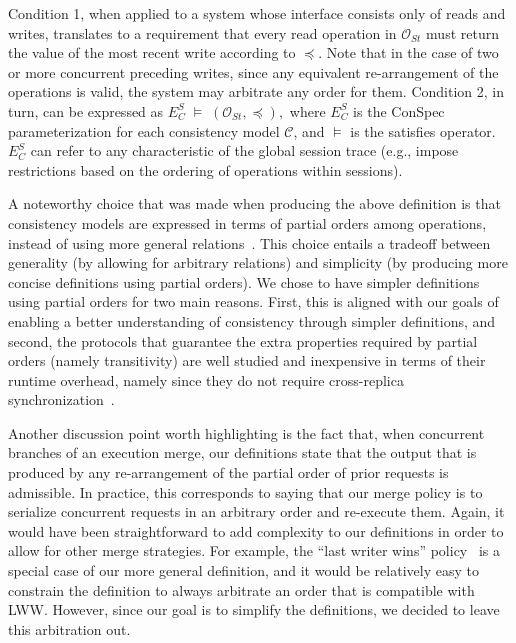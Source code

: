 \documentclass[journal, compsoc]{IEEEtran}
\begin{document}
	Condition 1, when applied to a system whose interface consists only of reads and writes, translates to a requirement that every read operation in %
	${\mathcal{O}_{St}}$ must return the value of the most recent write according to $\preccurlyeq$. Note that in the case of two or more concurrent preceding writes, since any  equivalent re-arrangement of the operations is valid, the system may arbitrate any order for them.
	Condition 2, in turn, can be expressed as $ E^S_C\; \vDash \; \left( {\mathcal{O}_{St}}, \preccurlyeq \right),$ where %
	$E^S_C$ is the ConSpec parameterization for each
	consistency model $\mathcal{C}$,
	and  $\vDash$ is the satisfies operator. $E^S_C$  can refer to any characteristic of the global session trace (e.g., impose restrictions based on the ordering of operations within sessions).
	\par A noteworthy choice that was made when producing the above definition is that consistency models are expressed in terms of  partial orders among operations, instead of using more general relations~\cite{Burckhardt:2014:PEC:2693641.2693642}. This choice entails a tradeoff between generality (by allowing for arbitrary relations) and simplicity (by producing more concise definitions using partial orders). We chose to have simpler definitions using partial orders for two main reasons. First, this is aligned with our goals of enabling a better understanding of consistency through simpler definitions, and second, the protocols that guarantee the extra properties required by partial orders (namely transitivity) are well studied and inexpensive in terms of their runtime overhead, namely since they do not require cross-replica synchronization~\cite{Bailis:2013:BCC:2463676.2465279,Lloyd:2011:DSE:2043556.2043593}.
	
	Another discussion point worth highlighting is the fact that, when concurrent branches of an execution merge, our definitions state that the output that is produced by any re-arrangement of the partial order of prior requests is admissible. In practice, this corresponds to saying that our merge policy is to serialize concurrent requests in an arbitrary order and re-execute them. Again, it would have been straightforward to add complexity to our definitions in order to allow for other merge strategies.
	For example, the ``last writer wins'' policy~\cite{lww} is a special case of our more general definition, and it would be relatively easy to constrain the definition to always arbitrate an order that is compatible with LWW. However, since our goal is to simplify the definitions, we decided to leave this arbitration out.
	
\end{document}
